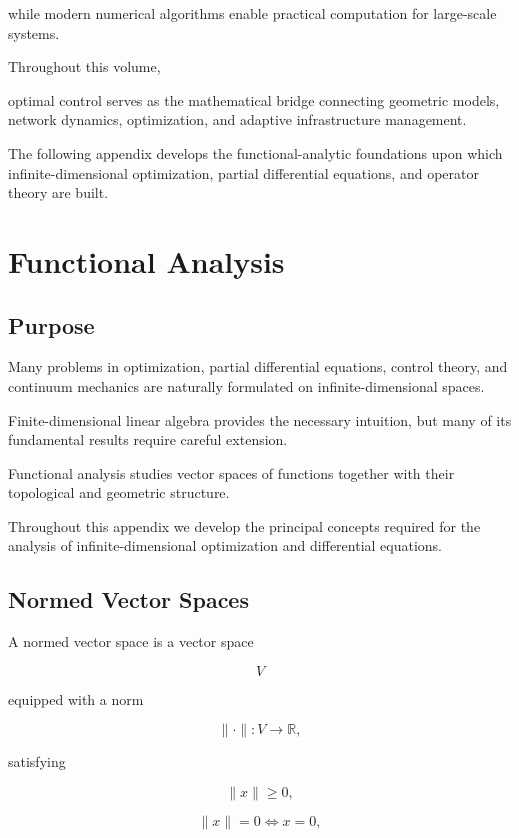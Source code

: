\documentclass[11pt,fleqn]{book}
\numberwithin{equation}{chapter}
\theoremstyle{plain}
\theoremstyle{definition}
\theoremstyle{remark}
\begin{document}
while modern numerical algorithms enable practical computation for
large-scale systems.

Throughout this volume,

optimal control serves as the mathematical bridge connecting geometric
models,
network dynamics,
optimization,
and adaptive infrastructure management.

The following appendix develops the functional-analytic foundations upon
which infinite-dimensional optimization, partial differential equations,
and operator theory are built.

\chapter{Functional Analysis}

\section{Purpose}

Many problems in optimization, partial differential equations, control
theory, and continuum mechanics are naturally formulated on
infinite-dimensional spaces.

Finite-dimensional linear algebra provides the necessary intuition, but
many of its fundamental results require careful extension.

Functional analysis studies vector spaces of functions together with
their topological and geometric structure.

Throughout this appendix we develop the principal concepts required for
the analysis of infinite-dimensional optimization and differential
equations.


\section{Normed Vector Spaces}

A normed vector space is a vector space

\[
V
\]

equipped with a norm

\[
\|\cdot\|:V\rightarrow\mathbb R,
\]

satisfying

\[
\|x\|\ge0,
\]

\[
\|x\|=0
\Longleftrightarrow
x=0,
\]
\end{document}
